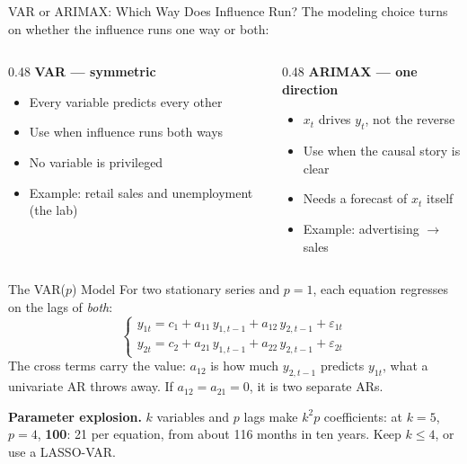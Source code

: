 \documentclass[aspectratio=169, 11pt]{beamer}
\begin{document}
\begin{frame}{VAR or ARIMAX: Which Way Does Influence Run?}
  The modeling choice turns on whether the influence runs one way or both:

  \vspace{0.2cm}
  \begin{columns}[T]
    \begin{column}{0.48\textwidth}
      \textbf{VAR --- symmetric}
      \begin{itemize}\small\itemsep0pt
        \item Every variable predicts every other
        \item Use when influence runs both ways
        \item No variable is privileged
        \item Example: retail sales and unemployment (the lab)
      \end{itemize}
    \end{column}
    \begin{column}{0.48\textwidth}
      \textbf{ARIMAX --- one direction}
      \begin{itemize}\small\itemsep0pt
        \item $x_t$ drives $y_t$, not the reverse
        \item Use when the causal story is clear
        \item Needs a forecast of $x_t$ itself
        \item Example: advertising $\to$ sales
      \end{itemize}
    \end{column}
  \end{columns}
\end{frame}

\begin{frame}{The VAR($p$) Model}
  For two stationary series and $p = 1$, each equation regresses on the lags of \emph{both}:
  \[
    \begin{cases}
      y_{1t} = c_1 + a_{11}\,y_{1,t-1} + a_{12}\,y_{2,t-1} + \varepsilon_{1t}\\[2pt]
      y_{2t} = c_2 + a_{21}\,y_{1,t-1} + a_{22}\,y_{2,t-1} + \varepsilon_{2t}
    \end{cases}
  \]
  The cross terms carry the value: $a_{12}$ is how much $y_{2,t-1}$ predicts $y_{1t}$,
  what a univariate AR throws away. If $a_{12} = a_{21} = 0$, it is two
  separate ARs.
  \begin{warningbox}
    \textbf{Parameter explosion.} $k$ variables and $p$ lags make $k^2 p$ coefficients: at
    $k=5$, $p=4$, \textbf{100}: 21 per equation, from about 116 months in ten years. Keep
    $k \leq 4$, or use a LASSO-VAR.
  \end{warningbox}
\end{frame}
\end{document}
